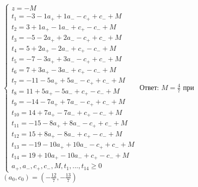 \documentclass[a4paper]{article}
\begin{document}
$\left\{\begin{array}{lll}
z=-M\\
t_{1}=-3-1a_++1a_--c_++c_-+M\\
t_{2}=3+1a_+-1a_-+c_+-c_-+M\\
t_{3}=-5-2a_++2a_--c_++c_-+M\\
t_{4}=5+2a_+-2a_-+c_+-c_-+M\\
t_{5}=-7-3a_++3a_--c_++c_-+M\\
t_{6}=7+3a_+-3a_-+c_+-c_-+M\\
t_{7}=-11-5a_++5a_--c_++c_-+M\\
t_{8}=11+5a_+-5a_-+c_+-c_-+M\\
t_{9}=-14-7a_++7a_--c_++c_-+M\\
t_{10}=14+7a_+-7a_-+c_+-c_-+M\\
t_{11}=-15-8a_++8a_--c_++c_-+M\\
t_{12}=15+8a_+-8a_-+c_+-c_-+M\\
t_{13}=-19-10a_++10a_--c_++c_-+M\\
t_{14}=19+10a_+-10a_-+c_+-c_-+M\\
a_+,a_-,c_+,c_-,M,t_1,...,t_{14}\geqslant 0
\end{array}\right.$\newline
Ответ: $M=\frac{4}{7}$ при $(a_0,c_0)=(-\frac{12}{7},-\frac{13}{7})$
\newpage
\end{document}
